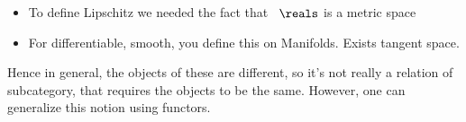 {\begin{itemize}

        \item To define Lipschitz we needed the fact that~ $\reals$ is a metric space
        \item For differentiable, smooth, you define this on Manifolds.
              Exists tangent space.
    \end{itemize}

    Hence in general, the objects of these are different, so it's not really a relation of subcategory, that requires the objects to be the same.
    However, one can generalize this notion using functors.

}
